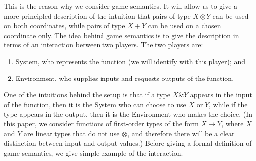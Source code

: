 This is the reason why we consider game semantics. It will allow us to give  a more principled description of the intuition that pairs of type $X \otimes Y$ can be used on both coordinates, while pairs of type $X + Y$ can be used on a chosen coordinate only. The idea behind game semantics is to give the description in terms of an interaction between two players.  The two players are:
\begin{enumerate}
    \item System, who represents the function (we will identify with this player); and
    \item Environment, who supplies inputs and requests outputs of the function.
\end{enumerate}
One of the intuitions behind the setup is that if a type $X \& Y$ appears in the input of the function, then it is the System who can choose to use $X$ or $Y$, while if the type appears in the output, then it is the Environment who makes the choice. (In this paper, we consider functions of first-order types of the form $X \to Y$, where $X$ and $Y$ are linear types that do not use $\otimes$, and therefore there will be a clear distinction between input and output values.)
Before giving a formal definition of game semantics, we give simple example of the interaction.

